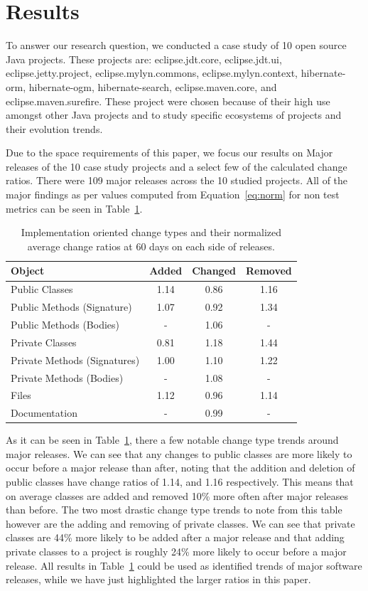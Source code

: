 \documentclass[conference]{IEEEtran}
\begin{document}
\section{Results}
\label{sec:results}

To answer our research question, we conducted a case study of 10 open source Java projects. These projects are: eclipse.jdt.core, eclipse.jdt.ui, eclipse.jetty.project, 
eclipse.mylyn.commons, eclipse.mylyn.context, hibernate-orm, hibernate-ogm, hibernate-search, eclipse.maven.core, and eclipse.maven.surefire. These project were chosen
because of their high use amongst other Java projects and to study specific ecosystems of projects and their evolution trends.

Due to the space requirements of this paper, we focus our results on Major releases of the 10 case study projects and a select few of the calculated change ratios. 
There were 109 major releases across the 10 studied projects. All of the major findings as per values computed from Equation~\ref{eq:norm} for non test metrics
can be seen in Table~\ref{tab:ratio}.

\begin{table}[h]
\begin{center}
\tabcolsep=0.11cm
\begin{tabular}{| l | c | c | c |}
\hline
Object & Added & Changed & Removed\\
\hline
Public Classes & 1.14 & 0.86 & 1.16 \\
Public Methods (Signature) & 1.07 & 0.92 & 1.34 \\
Public Methods (Bodies) & - & 1.06 & - \\
Private Classes & 0.81 & 1.18 & 1.44 \\
Private Methods (Signatures) & 1.00 & 1.10 & 1.22 \\
Private Methods (Bodies) & - & 1.08 & - \\
Files & 1.12 & 0.96 & 1.14 \\
Documentation & - & 0.99 & - \\
\hline
\end{tabular}
\end{center}
\caption{Implementation oriented change types and their normalized average change ratios at 60 days on each side of releases. \label{tab:ratio}}
\end{table}

As it can be seen in Table~\ref{tab:ratio}, there a few notable change type trends around major releases. We can see that any changes to public classes are
more likely to occur before a major release than after, noting that the addition and deletion of public classes have change ratios of 1.14, 
and 1.16 respectively. This means that on average classes are added and removed 10\% more often after major releases than before.
The two most drastic change type trends to note from this table however are the adding and removing of private classes. We can see that private classes are
44\% more likely to be added after a major release and that adding private classes to a project is roughly 24\% more likely to occur before a major release.
All results in Table~\ref{tab:ratio} could be used as identified trends of major software releases, while we have just highlighted the larger ratios in
this paper.
\end{document}
